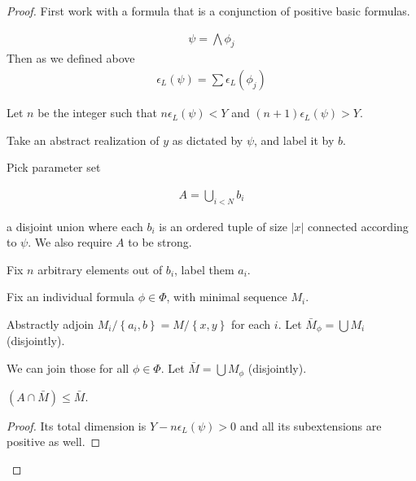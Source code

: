 \documentclass{amsart}
\newcommand{\curly}[1]{\left\{#1\right\}}
\begin{document}


\begin{proof}
	First work with a formula that is a conjunction of positive basic formulas.

	\begin{align*}
		\psi = \bigwedge \phi_j
	\end{align*}
	Then as we defined above
	\begin{align*}
		\epsilon_L(\psi) = \sum \epsilon_L(\phi_j)
	\end{align*}

	Let $n$ be the integer such that $n \epsilon_L(\psi) < Y$ and $(n+1) \epsilon_L(\psi) > Y$.

	Take an abstract realization of $y$ as dictated by $\psi$, and label it by $b$.

	Pick parameter set 

	\begin{align*}
		A = \bigcup_{i<N} b_i
	\end{align*}

	a disjoint union where each $b_i$ is an ordered tuple of size $|x|$ connected according to $\psi$.
	We also require $A$ to be strong.

	Fix $n$ arbitrary elements out of $b_i$, label them $a_i$.

	Fix an individual formula $\phi \in \Phi$, with minimal sequence $M_i$.

	Abstractly adjoin $M_i/\curly{a_i, b} = M/\curly{x,y}$ for each $i$.
	Let $\bar M_\phi = \bigcup M_i$ (disjointly).

	We can join those for all $\phi \in \Phi$.
	Let $\bar M = \bigcup M_\phi$ (disjointly).

	\begin{Claim}
		$(A \cap \bar M) \leq \bar M$.
	\end{Claim}
	\begin{proof}
		Its total dimension is $Y - n\epsilon_L(\psi) > 0$ and all its subextensions are positive as well.
	\end{proof}


\end{proof}
\end{document}
